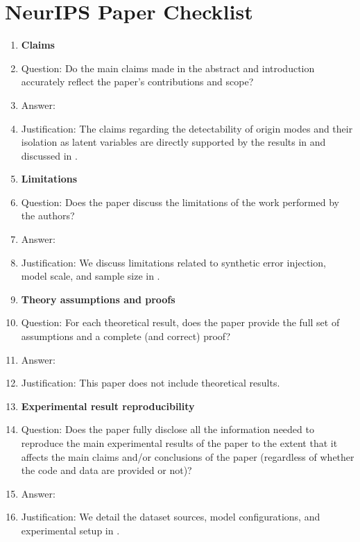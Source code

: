 \section*{NeurIPS Paper Checklist}

\begin{enumerate}

\item {\bf Claims}
    \item[] Question: Do the main claims made in the abstract and introduction accurately reflect the paper's contributions and scope?
    \item[] Answer: \answerYes{}
    \item[] Justification: The claims regarding the detectability of origin modes and their isolation as latent variables are directly supported by the results in  and discussed in .

\item {\bf Limitations}
    \item[] Question: Does the paper discuss the limitations of the work performed by the authors?
    \item[] Answer: \answerYes{}
    \item[] Justification: We discuss limitations related to synthetic error injection, model scale, and sample size in .

\item {\bf Theory assumptions and proofs}
    \item[] Question: For each theoretical result, does the paper provide the full set of assumptions and a complete (and correct) proof?
    \item[] Answer: \answerNA{}
    \item[] Justification: This paper does not include theoretical results.

    \item {\bf Experimental result reproducibility}
    \item[] Question: Does the paper fully disclose all the information needed to reproduce the main experimental results of the paper to the extent that it affects the main claims and/or conclusions of the paper (regardless of whether the code and data are provided or not)?
    \item[] Answer: \answerYes{}
    \item[] Justification: We detail the dataset sources, model configurations, and experimental setup in .


\end{enumerate}
